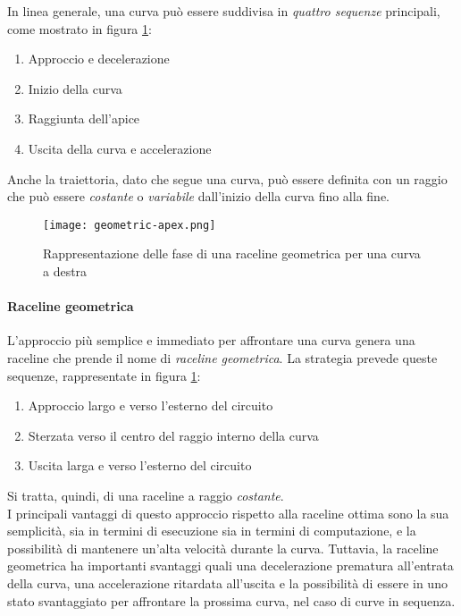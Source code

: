 In linea generale, una curva può essere suddivisa in \textit{quattro sequenze} principali, come mostrato
in figura \ref{fig:geom-raceline}:
\begin{enumerate}
	\item Approccio e decelerazione
	\item Inizio della curva
	\item Raggiunta dell'apice
	\item Uscita della curva e accelerazione
\end{enumerate}

Anche la traiettoria, dato che segue una curva, può essere definita con un raggio che può essere
\textit{costante} o \textit{variabile} dall'inizio della curva fino alla fine.

\begin{figure}[H]
	\begin{center}
		\texttt{[image: geometric-apex.png]}
	\end{center}
	\caption{Rappresentazione delle fase di una raceline geometrica per una curva a destra \cite{drivingfast}}
	\label{fig:geom-raceline}
\end{figure}

\paragraph{Raceline geometrica}
L'approccio più semplice e immediato per affrontare una curva genera una raceline che prende il
nome di \textit{raceline geometrica}. La strategia prevede queste sequenze, rappresentate in figura
\ref{fig:geom-raceline}:
\begin{enumerate}
	\item Approccio largo e verso l'esterno del circuito
	\item Sterzata verso il centro del raggio interno della curva
	\item Uscita larga e verso l'esterno del circuito
\end{enumerate}
Si tratta, quindi, di una raceline a raggio \textit{costante}.\\
I principali vantaggi di questo approccio rispetto alla raceline ottima sono la sua semplicità, sia in
termini di esecuzione sia in termini di computazione, e la possibilità di mantenere un'alta velocità
durante la curva. Tuttavia, la raceline geometrica ha importanti svantaggi quali una decelerazione
prematura all'entrata della curva, una accelerazione ritardata all'uscita e la possibilità di essere in
uno stato svantaggiato per affrontare la prossima curva, nel caso di curve in sequenza.

